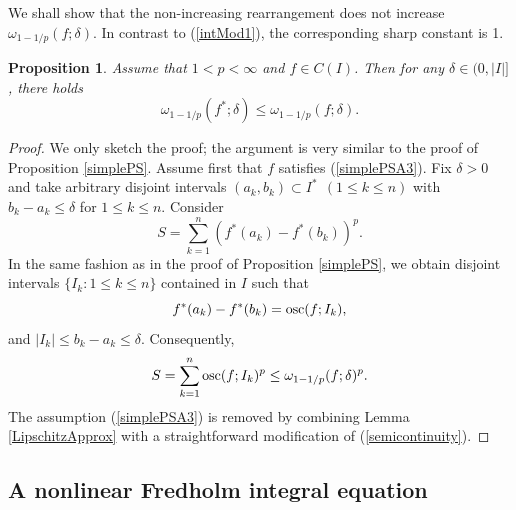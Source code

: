 \documentclass{amsart}
\newtheorem{prop}[theorem]{Proposition}
\DeclareMathOperator{\osc}{{\rm osc}}
\numberwithin{equation}{section}
\begin{document}
We shall show that the non-increasing rearrangement does not increase $\omega_{1-1/p}(f;\delta)$. In contrast to (\ref{intMod1}), the corresponding sharp constant is 1.
\begin{prop}
    Assume that $1<p<\infty$ and $f\in C(I)$. Then for any $\delta\in(0,|I|]$, there holds
    \begin{equation}
        \label{pModIneq}
        \omega_{1-1/p}(f^*;\delta)\le\omega_{1-1/p}(f;\delta).
    \end{equation}
\end{prop}
\begin{proof}
    We only sketch the proof; the argument is very similar to the proof of Proposition \ref{simplePS}.
    Assume first that $f$ satisfies (\ref{simplePSA3}). Fix $\delta>0$ and take arbitrary disjoint intervals $(a_k,b_k)\subset I^*~~(1\le k\le n)$ with $b_k-a_k\le\delta$ for $1\le k\le n$. Consider
    \begin{equation}
        \nonumber
        S=\sum_{k=1}^n(f^*(a_k)-f^*(b_k))^p.
    \end{equation}
    In the same fashion as in the proof of Proposition \ref{simplePS}, we obtain disjoint intervals $\{I_k:1\le k\le n\}$ contained in $I$ such that
    \begin{equation}
        \nonumber
        f^*(a_k)-f^*(b_k)=\osc(f;I_k),
    \end{equation}
    and $|I_k|\le b_k-a_k\le\delta$. Consequently,
    \begin{equation}
        \nonumber
        S=\sum_{k=1}^n\osc(f;I_k)^p\le\omega_{1-1/p}(f;\delta)^p.
    \end{equation}
    The assumption (\ref{simplePSA3}) is removed by combining Lemma \ref{LipschitzApprox} with a straightforward modification of (\ref{semicontinuity}).
\end{proof}


\subsection{A nonlinear Fredholm integral equation}
\end{document}
